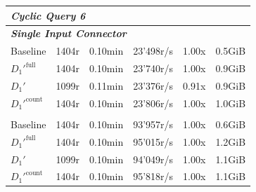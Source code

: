 \begin{longtable}{lrrrrr}
    \multicolumn{6}{l}{\textit{Cyclic Query 6}} \\
    \midrule
    \multicolumn{6}{l}{\textit{\textbf{Single Input Connector}}} \\
    \nopagebreak
    Baseline              &  1404r                &  0.10min            &  23'498r/s            & 1.00x             & 0.5GiB    \\
    $D_1'^{\text{full}}$   &  1404r                &  0.10min            &  23'740r/s            & 1.00x             & 0.9GiB    \\
    \quad $D_1'$           &  1099r                &  0.11min            &  23'376r/s            & 0.91x             & 0.9GiB    \\
    $D_1'^{\text{count}}$  &  1404r                &  0.10min            &  23'806r/s            & 1.00x             & 1.0GiB    \\
    \addlinespace 
    
    \multicolumn{6}{l}{\textit{\textbf{4 Input Connectors}}} \\
    \nopagebreak
    Baseline              &  1404r                &  0.10min            &  93'957r/s            & 1.00x             & 0.6GiB    \\
    $D_1'^{\text{full}}$   &  1404r                &  0.10min            &  95'015r/s            & 1.00x             & 1.2GiB    \\
    \quad $D_1'$           &  1099r                &  0.10min            &  94'049r/s            & 1.00x             & 1.1GiB    \\ 
    $D_1'^{\text{count}}$  &  1404r                &  0.10min            &  95'818r/s            & 1.00x             & 1.1GiB    \\

    \bottomrule

\end{longtable}

